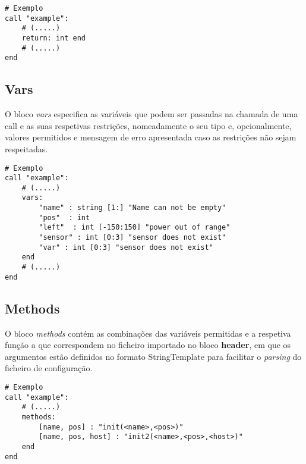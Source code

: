 \documentclass{report}
\begin{document}
\begin{verbatim}
# Exemplo
call "example":
    # (.....)
    return: int end
    # (.....)
end
\end{verbatim}

\subsection{Vars}
O bloco \textit{vars} especifica as variáveis que podem ser passadas na chamada de uma call e as suas respetivas restrições, nomeadamente o seu tipo e, opcionalmente, valores permitidos e mensagem de erro apresentada caso as restrições não sejam respeitadas.
 
\begin{verbatim}
# Exemplo
call "example":
    # (.....)
    vars: 
        "name" : string [1:] "Name can not be empty"
        "pos"  : int
        "left"  : int [-150:150] "power out of range"
        "sensor" : int [0:3] "sensor does not exist"
        "var" : int [0:3] "sensor does not exist"
    end
    # (.....)
end
\end{verbatim}

\subsection{Methods}
O bloco \textit{methods} contém as combinações das variáveis permitidas e a respetiva função a que correspondem no ficheiro importado no bloco \textbf{header}, em que os argumentos estão definidos no formato StringTemplate para facilitar o \textit{parsing} do ficheiro de configuração.

\begin{verbatim}
# Exemplo
call "example":
    # (.....)
    methods:
        [name, pos] : "init(<name>,<pos>)"
        [name, pos, host] : "init2(<name>,<pos>,<host>)"
    end
end
\end{verbatim}

\end{document}
